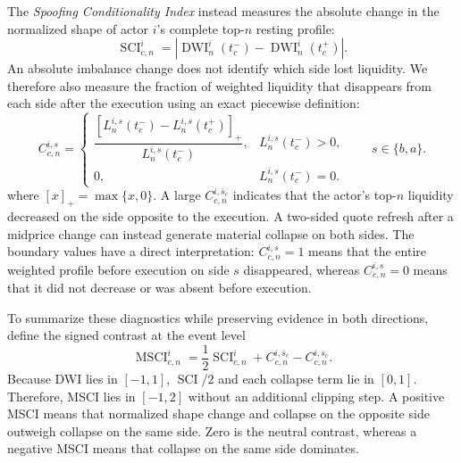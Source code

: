 \documentclass[11pt]{article}
\newenvironment{review}{\begingroup\color{blue}}{\endgroup}
\begin{document}
The \textit{Spoofing Conditionality Index} instead measures the absolute change in the normalized shape of actor $i$'s
complete top-$n$ resting profile:
\begin{equation}
    \operatorname{SCI}^{i}_{c,n}
    =
    \left|
        \operatorname{DWI}^{i}_{n}(t_c^{-})
        -
        \operatorname{DWI}^{i}_{n}(t_c^{+})
    \right|.
    \label{eq:topn_sci}
\end{equation}
An absolute imbalance change does not identify which side lost liquidity. We therefore also measure the fraction of
weighted liquidity that disappears from each side after the execution using an exact piecewise definition:
\begin{equation}
    C^{i,s}_{c,n}
    =\begin{cases}
    \dfrac{
        \left[
            L^{i,s}_{n}(t_c^{-})-L^{i,s}_{n}(t_c^{+})
        \right]_{+}
    }{
        L^{i,s}_{n}(t_c^{-})
    },
    & L^{i,s}_{n}(t_c^{-})>0,\\
    0,
    & L^{i,s}_{n}(t_c^{-})=0.
    \end{cases}
    \qquad s\in\{b,a\}.
    \label{eq:side_collapse}
\end{equation}
where $[x]_{+}=\max\{x,0\}$. A large $C^{i,\bar{s}_c}_{c,n}$ indicates that the actor's top-$n$ liquidity decreased on the
side opposite to the execution. A two-sided quote refresh after a midprice change can instead generate material
collapse on both sides. The boundary values have a direct interpretation:
$C^{i,s}_{c,n}=1$ means that the entire \begin{review}weighted profile before execution\end{review} on side $s$ disappeared, whereas
$C^{i,s}_{c,n}=0$ means that it did not decrease or was absent before execution.

To summarize these diagnostics while preserving evidence in both directions, define \begin{review}the signed contrast at the event level\end{review}
\begin{equation}
    \operatorname{MSCI}^{i}_{c,n}
    =\frac{1}{2}\operatorname{SCI}^{i}_{c,n}
     +C^{i,\bar{s}_c}_{c,n}
     -C^{i,s_c}_{c,n}.
    \label{eq:signed_msci}
\end{equation}
Because DWI lies in $[-1,1]$, $\operatorname{SCI}/2$ and each collapse term lie in $[0,1]$. Therefore, MSCI lies in
$[-1,2]$ without an additional clipping step. A positive MSCI means that normalized shape change and \begin{review}collapse on the opposite side\end{review}
outweigh \begin{review}collapse on the same side\end{review}. Zero is the neutral contrast, whereas a negative MSCI means that \begin{review}collapse on the same side\end{review} dominates.
\end{document}
